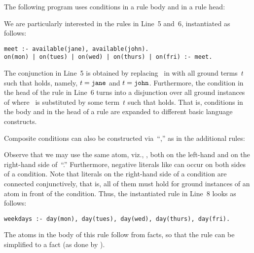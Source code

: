 \begin{example}\label{ex:cond}
The following program uses conditions in a rule body and in a rule head:
%

%
We are particularly interested in the rules in Line~5 and~6,
instantiated as follows:%
%
\begin{lstlisting}[firstnumber=5]
meet :- available(jane), available(john).
on(mon) | on(tues) | on(wed) | on(thurs) | on(fri) :- meet.
\end{lstlisting}
%
The conjunction in Line~5 is obtained by replacing~ in
 with all ground terms~$t$ such that
 holds, namely, $t=\texttt{jane}$ and $t=\texttt{john}$.
Furthermore, the condition in the head of the rule in Line~6 turns into
a disjunction over all ground instances of
 where~ is substituted by some term~$t$
such that
 holds.
That is, conditions in the body and in the head of a rule
are expanded to different basic language constructs.

Composite conditions can also be constructed via~``\code{:},''
as in the additional rules:
%

%
Observe that we may use the same atom, viz., ,
both on the left-hand and on the right-hand side of~``\code{:}.''
Furthermore, negative literals like 
can occur on both sides of a condition.
Note that literals on the right-hand side of a condition are connected conjunctively, that is,
all of them must hold for ground instances of an atom in front
of the condition.
Thus, the instantiated rule in Line~8 looks as follows:
%
\begin{lstlisting}[firstnumber=8]
weekdays :- day(mon), day(tues), day(wed), day(thurs), day(fri).
\end{lstlisting}
%
The atoms in the body of this rule follow from facts, so that
the rule can be simplified to a fact 
(as done by \gringo).
\eexample
\end{example}

